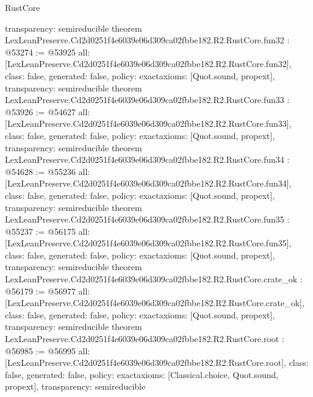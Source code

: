 \begin{lexlean}{RustCore}
\begin{coremodule}
{  transparency: semireducible
}
theorem LexLeanPreserve.Cd2d0251f4e6039e06d309ca02fbbe182.R2.RustCore.fun32 : @53274 := @53925 {
  all: [LexLeanPreserve.Cd2d0251f4e6039e06d309ca02fbbe182.R2.RustCore.fun32],
  class: false,
  generated: false,
  policy: exact{axioms: [Quot.sound, propext]},
  transparency: semireducible
}
theorem LexLeanPreserve.Cd2d0251f4e6039e06d309ca02fbbe182.R2.RustCore.fun33 : @53926 := @54627 {
  all: [LexLeanPreserve.Cd2d0251f4e6039e06d309ca02fbbe182.R2.RustCore.fun33],
  class: false,
  generated: false,
  policy: exact{axioms: [Quot.sound, propext]},
  transparency: semireducible
}
theorem LexLeanPreserve.Cd2d0251f4e6039e06d309ca02fbbe182.R2.RustCore.fun34 : @54628 := @55236 {
  all: [LexLeanPreserve.Cd2d0251f4e6039e06d309ca02fbbe182.R2.RustCore.fun34],
  class: false,
  generated: false,
  policy: exact{axioms: [Quot.sound, propext]},
  transparency: semireducible
}
theorem LexLeanPreserve.Cd2d0251f4e6039e06d309ca02fbbe182.R2.RustCore.fun35 : @55237 := @56175 {
  all: [LexLeanPreserve.Cd2d0251f4e6039e06d309ca02fbbe182.R2.RustCore.fun35],
  class: false,
  generated: false,
  policy: exact{axioms: [Quot.sound, propext]},
  transparency: semireducible
}
theorem LexLeanPreserve.Cd2d0251f4e6039e06d309ca02fbbe182.R2.RustCore.crate_ok : @56179 := @56977 {
  all: [LexLeanPreserve.Cd2d0251f4e6039e06d309ca02fbbe182.R2.RustCore.crate_ok],
  class: false,
  generated: false,
  policy: exact{axioms: [Quot.sound, propext]},
  transparency: semireducible
}
theorem LexLeanPreserve.Cd2d0251f4e6039e06d309ca02fbbe182.R2.RustCore.root : @56985 := @56995 {
  all: [LexLeanPreserve.Cd2d0251f4e6039e06d309ca02fbbe182.R2.RustCore.root],
  class: false,
  generated: false,
  policy: exact{axioms: [Classical.choice, Quot.sound, propext]},
  transparency: semireducible
}


\end{coremodule}
\end{lexlean}
